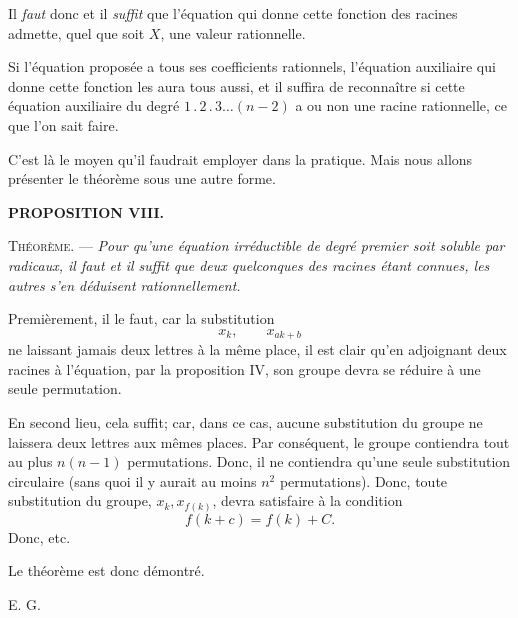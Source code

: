 
Il \emph{faut} donc et il \emph{suffit} que l'équation qui donne cette fonction
des racines admette, quel que soit $X$, une valeur rationnelle.

Si l'équation proposée a tous ses coefficients rationnels, l'équation
auxiliaire qui donne cette fonction les aura tous aussi, et il
suffira de reconnaître si cette équation auxiliaire du degré
$1\mathbin{.}2\mathbin{.}3\ldots(n-2)$ a ou non une racine rationnelle, ce que l'on
sait faire.

C'est là le moyen qu'il faudrait employer dans la pratique. Mais
nous allons présenter le théorème sous une autre forme.

\begin{center}{\bfseries PROPOSITION VIII.}\end{center}

\noindent\textsc{Théorème.} --- {\itshape Pour qu'une équation irréductible de degré
premier soit soluble par radicaux, il \emph{faut} et il \emph{suffit} que deux
quelconques des racines étant connues, les autres s'en déduisent
rationnellement.}

Premièrement, il le faut, car la substitution
\[
x_{k},\qquad x_{ak+b}
\]
ne laissant jamais deux lettres à la même place, il est clair qu'en
adjoignant deux racines à l'équation, par la proposition IV, son
groupe devra se réduire à une seule permutation.

En second lieu, cela suffit; car, dans ce cas, aucune substitution
du groupe ne laissera deux lettres aux mêmes places. Par conséquent,
le groupe contiendra tout au plus $n(n-1)$ permutations.
Donc, il ne contiendra qu'une seule substitution circulaire (sans
quoi il y aurait au moins $n^{2}$ permutations). Donc, toute substitution
du groupe, $x_{k},x_{f(k)}$, devra satisfaire à la condition
\[
f(k+c)=f(k)+C.
\]
Donc, etc.

Le théorème est donc démontré.

\medskip
\noindent\hfill \textsc{E. G.}\hspace{3em}
